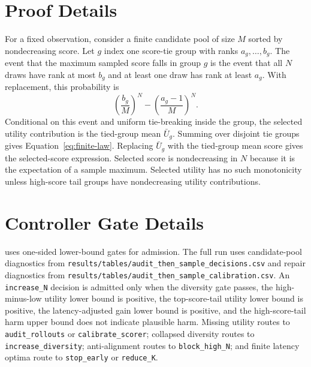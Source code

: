 \section{Proof Details}
\label{app:proof}

For a fixed observation, consider a finite candidate pool of size $M$ sorted by nondecreasing score. Let $g$ index one score-tie group with ranks $a_g,\ldots,b_g$. The event that the maximum sampled score falls in group $g$ is the event that all $N$ draws have rank at most $b_g$ and at least one draw has rank at least $a_g$. With replacement, this probability is
\[
\left(\frac{b_g}{M}\right)^N -
\left(\frac{a_g-1}{M}\right)^N.
\]
Conditional on this event and uniform tie-breaking inside the group, the selected utility contribution is the tied-group mean $\bar U_g$. Summing over disjoint tie groups gives Equation~\ref{eq:finite-law}. Replacing $\bar U_g$ with the tied-group mean score gives the selected-score expression. Selected score is nondecreasing in $N$ because it is the expectation of a sample maximum. Selected utility has no such monotonicity unless high-score tail groups have nondecreasing utility contributions.

\section{Controller Gate Details}
\label{app:controller}

\ats{} uses one-sided lower-bound gates for admission. The full run uses candidate-pool diagnostics from \texttt{results/tables/audit\_then\_sample\_decisions.csv} and repair diagnostics from \texttt{results/tables/audit\_then\_sample\_calibration.csv}. An \texttt{increase\_N} decision is admitted only when the diversity gate passes, the high-minus-low utility lower bound is positive, the top-score-tail utility lower bound is positive, the latency-adjusted gain lower bound is positive, and the high-score-tail harm upper bound does not indicate plausible harm. Missing utility routes to \texttt{audit\_rollouts} or \texttt{calibrate\_scorer}; collapsed diversity routes to \texttt{increase\_diversity}; anti-alignment routes to \texttt{block\_high\_N}; and finite latency optima route to \texttt{stop\_early} or \texttt{reduce\_K}.

